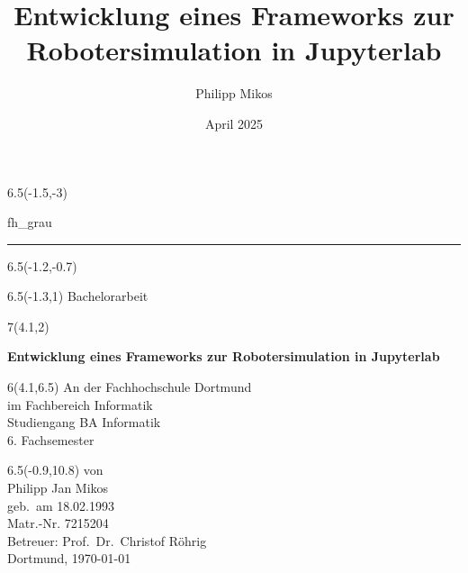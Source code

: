 \documentclass[12pt]{article}
\title{Entwicklung eines Frameworks zur Robotersimulation in Jupyterlab}
\author{Philipp Mikos}
\date{April 2025}
\begin{document}
\begin{titlepage}
	\begin{textblock}{6.5}(-1.5,-3)
		\begin{color}{fh_grau}
			\rule{6.35cm}{33cm}    
		\end{color}
	\end{textblock}
	\begin{textblock}{6.5}(-1.2,-0.7)
	\end{textblock}
	\begin{textblock}{6.5}(-1.3,1)
		{\large \textsf{Bachelorarbeit}}            
	\end{textblock}
	
	\begin{textblock}{7}(4.1,2)
		{ \huge \raggedright \linespread{0.9}
			\textsf{\textbf{Entwicklung eines Frameworks zur Robotersimulation in Jupyterlab\\[0.3cm] 
					} }}
	\end{textblock}
	
	
	\begin{textblock}{6}(4.1,6.5)\noindent
		\textsf{An der Fachhochschule Dortmund\\
			im Fachbereich Informatik\\
			Studiengang BA Informatik \\
			6. Fachsemester}
	\end{textblock}
	
	\begin{textblock}{6.5}(-0.9,10.8)
		\noindent
		\textsf{von \\
			Philipp Jan Mikos \\
			geb.\ am 18.02.1993  \\
			Matr.-Nr. 7215204	\\
			Betreuer: Prof.\ Dr.\ Christof Röhrig \\[0.5cm]
			Dortmund, \today}    
	\end{textblock}
	
\end{titlepage}

\justifying
{}

\newpage

\newpage
\tableofcontents
\newpage
\listoffigures
\newpage
\listoftables
\newpage
\listofalgorithms
\newpage
\clearpage
{}


\newpage

\newpage

\newpage

\newpage

\newpage

\newpage

%
\newpage


\newpage
\printbibliography
\newpage
{}
%

\end{document}
